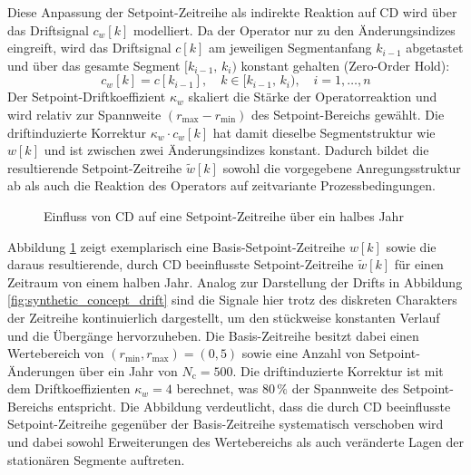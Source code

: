 %
Diese Anpassung der Setpoint-Zeitreihe als indirekte Reaktion auf \ac{CD} wird über das Driftsignal $c_w[k]$ modelliert. Da der Operator nur zu den Änderungsindizes eingreift, wird das Driftsignal $c[k]$ am jeweiligen Segmentanfang $k_{i-1}$ abgetastet und über das gesamte Segment $[k_{i-1},\, k_i)$ konstant gehalten (Zero-Order Hold):
%
\begin{equation}
    c_w[k] = c[k_{i-1}],
    \quad k \in [k_{i-1},\, k_i), \quad i = 1, \dots, n
\end{equation}
%
Der Setpoint-Driftkoeffizient $\kappa_w$ skaliert die Stärke der Operatorreaktion und wird relativ zur Spannweite $(r_{\max} - r_{\min})$ des Setpoint-Bereichs gewählt. Die driftinduzierte Korrektur $\kappa_w \cdot c_w[k]$ hat damit dieselbe Segmentstruktur wie $w[k]$ und ist zwischen zwei Änderungsindizes konstant. Dadurch bildet die resultierende Setpoint-Zeitreihe $\tilde{w}[k]$ sowohl die vorgegebene Anregungsstruktur ab als auch die Reaktion des Operators auf zeitvariante Prozessbedingungen. \par
%
\begin{figure}[b!]
    \centering
    \makebox[\textwidth][c]{%
        
    }
    \caption{Einfluss von \ac{CD} auf eine Setpoint-Zeitreihe über ein halbes Jahr}
    \label{fig:setpoint_cd}
\end{figure}
%
Abbildung \ref{fig:setpoint_cd} zeigt exemplarisch eine Basis-Setpoint-Zeitreihe $w[k]$ sowie die daraus resultierende, durch \ac{CD} beeinflusste Setpoint-Zeitreihe $\tilde{w}[k]$ für einen Zeitraum von einem halben Jahr. Analog zur Darstellung der Drifts in Abbildung \ref{fig:synthetic_concept_drift} sind die Signale hier trotz des diskreten Charakters der Zeitreihe kontinuierlich dargestellt, um den stückweise konstanten Verlauf und die Übergänge hervorzuheben. Die Basis-Zeitreihe besitzt dabei einen Wertebereich von $(r_{\min}, r_{\max}) = (0, 5)$ sowie eine Anzahl von Setpoint-Änderungen über ein Jahr von $N_{\mathrm{c}}=500$. 
Die driftinduzierte Korrektur ist mit dem Driftkoeffizienten $\kappa_w = 4$ berechnet, was $80\,\%$ der Spannweite des Setpoint-Bereichs entspricht. Die Abbildung verdeutlicht, dass die durch \ac{CD} beeinflusste Setpoint-Zeitreihe gegenüber der Basis-Zeitreihe systematisch verschoben wird und dabei sowohl Erweiterungen des Wertebereichs als auch veränderte Lagen der stationären Segmente auftreten.
%

